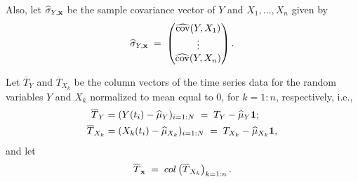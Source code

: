 
Also, let $\widehat\sigma_{Y,\mathbf{x}}$ be the sample covariance vector of $Y$ and $X_1,
\ldots, X_n$ given by
\begin{equation}
\widehat\sigma_{Y,\mathbf{x}} \;=\; \begin{pmatrix} \widehat{\operatorname{cov}}(Y,X_1) \\ \vdots \\
\widehat{\operatorname{cov}}(Y,X_n) \end{pmatrix}.
\end{equation}

Let $\overline{T}_Y$ and $\overline{T}_{X_k}$ be the column vectors of the time series
data for the random variables $Y$ and $X_k$ normalized to mean equal to $0$, for
$k=1:n$, respectively, i.e.,
\begin{align}
\overline{T}_Y &= (Y(t_i)-\widehat\mu_Y)_{i=1:N} \;=\; T_Y - \widehat\mu_Y\mathbf{1};\\
\overline{T}_{X_k} &= (X_k(t_i)-\widehat\mu_{X_k})_{i=1:N} \;=\; T_{X_k} -
\widehat\mu_{X_k}\mathbf{1},
\end{align}
and let
\begin{equation}
\overline{T}_{\mathbf{x}} \;=\; col\left(\overline{T}_{X_k}\right)_{k=1:n}.
\end{equation}

